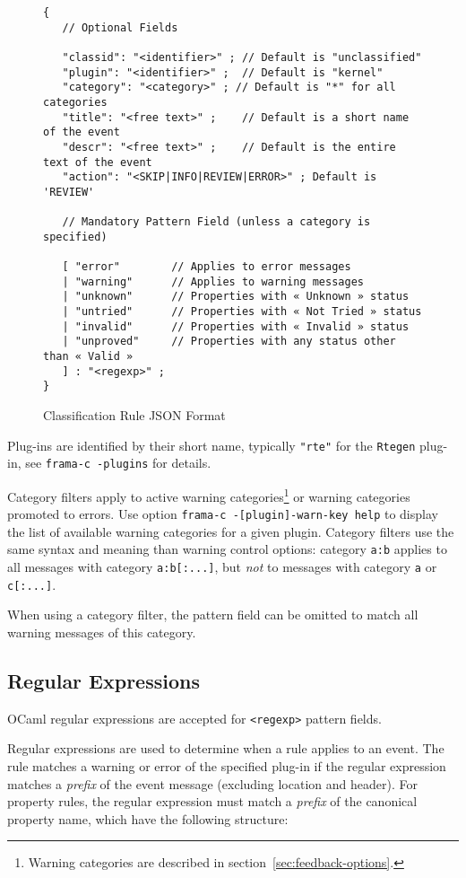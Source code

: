 \begin{figure}[htbp]
\begin{verbatim}
{
   // Optional Fields

   "classid": "<identifier>" ; // Default is "unclassified"
   "plugin": "<identifier>" ;  // Default is "kernel"
   "category": "<category>" ; // Default is "*" for all categories
   "title": "<free text>" ;    // Default is a short name of the event
   "descr": "<free text>" ;    // Default is the entire text of the event
   "action": "<SKIP|INFO|REVIEW|ERROR>" ; Default is 'REVIEW'

   // Mandatory Pattern Field (unless a category is specified)

   [ "error"        // Applies to error messages
   | "warning"      // Applies to warning messages
   | "unknown"      // Properties with « Unknown » status
   | "untried"      // Properties with « Not Tried » status
   | "invalid"      // Properties with « Invalid » status
   | "unproved"     // Properties with any status other than « Valid »
   ] : "<regexp>" ;
}
\end{verbatim}
\caption{Classification Rule JSON Format}
\label{report-classification-rule}
\end{figure}

Plug-ins are identified by their short name, typically \verb+"rte"+ for the \verb+Rtegen+ plug-in,
see \verb+frama-c -plugins+ for details.

Category filters apply to active warning categories\footnote{Warning categories
  are described in section~\ref{sec:feedback-options}.}
or warning categories promoted to errors.
Use option \verb+frama-c -[plugin]-warn-key help+ to display the list of available warning categories for a given plugin.
Category filters use the same syntax and meaning than warning control options: category \verb+a:b+ applies to all messages
with category \verb+a:b[:...]+, but \emph{not} to messages with category \verb+a+ or \verb+c[:...]+.

When using a category filter, the pattern field can be omitted to match all warning messages of this category.

\subsection{Regular Expressions}

\textsf{OCaml} regular expressions are accepted for \verb+<regexp>+ pattern fields.

Regular expressions are used to determine when a rule applies to an event. The rule matches a warning or error of the specified
plug-in if the regular expression matches a \emph{prefix} of the event message (excluding location and header).
For property rules, the regular expression must match a \emph{prefix} of the canonical property name,
which have the following structure:

